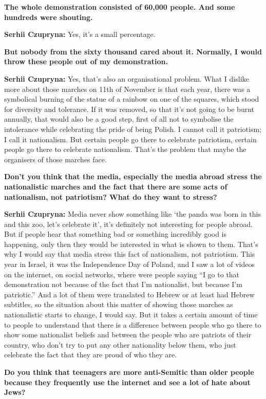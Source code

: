 \textbf{The whole demonstration consisted of 60,000 people. And some hundreds were shouting.}\par 
\textbf{Serhii Czupryna:} Yes, it’s a small percentage. \par
\textbf{But nobody from the sixty thousand cared about it. Normally, I would throw these people out of my demonstration.} \par 
\textbf{Serhii Czupryna:} Yes, that’s also an organisational problem. What I dislike more about those marches on 11th of November is that each year, there was a symbolical burning of the statue of a rainbow on one of the squares, which stood for diversity and tolerance. If it was removed, so that it’s not going to be burnt annually, that would also be a good step, first of all not to symbolise the intolerance while celebrating the pride of being Polish. I cannot call it patriotism; I call it nationalism. But certain people go there to celebrate patriotism, certain people go there to celebrate nationalism. That’s the problem that maybe the organisers of those marches face.\par
\textbf{Don’t you think that the media, especially the media abroad stress the nationalistic marches and the fact that there are some acts of nationalism, not patriotism? What do they want to stress?}\par 
\textbf{Serhii Czupryna:} Media never show something like ‘the panda was born in this and this zoo, let’s celebrate it’, it’s definitely not interesting for people abroad. But if people hear that something bad or something incredibly good is happening, only then they would be interested in what is shown to them. That’s why I would say that media stress this fact of nationalism, not patriotism. This year in Israel, it was the Independence Day of Poland, and I saw a lot of videos on the internet, on social networks, where were people saying ``I go to that demonstration not because of the fact that I’m nationalist, but because I’m patriotic.'' And a lot of them were translated to Hebrew or at least had Hebrew subtitles, so the situation about this matter of showing those marches as nationalistic starts to change, I would say. But it takes a certain amount of time to people to understand that there is a difference between people who go there to show some nationalist beliefs and between the people who are patriots of their country, who don’t try to put any other nationality below them, who just celebrate the fact that they are proud of who they are.\par
\textbf{Do you think that teenagers are more anti-Semitic than older people because they frequently use the internet and see a lot of hate about Jews? }\par
